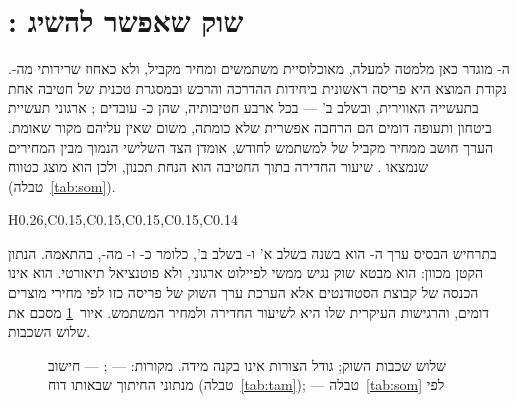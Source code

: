 \section{: שוק שאפשר להשיג}\label{sec:som}
ה- מוגדר כאן מלמטה למעלה, מאוכלוסיית משתמשים ומחיר מקביל, ולא כאחוז שרירותי מה-. נקודת המוצא היא
פריסה ראשונית ביחידות ההדרכה והרכש ובמסגרת טכנית של חטיבה אחת בתעשייה האווירית, ובשלב ב' --- בכל ארבע חטיבותיה, שהן
כ- עובדים \cite{iai2025about}; ארגוני תעשיית ביטחון ותעופה דומים הם הרחבה אפשרית שלא כומתה, משום שאין עליהם
מקור שאומת. הערך חושב ממחיר מקביל של  למשתמש לחודש, אומדן הצד השלישי הנמוך מבין המחירים שנמצאו
\cite{manualto2026pricing}. שיעור החדירה בתוך החטיבה הוא הנחת תכנון, ולכן הוא מוצג כטווח (טבלה~\ref{tab:som}).
\begin{table}[!htbp]
\centering
\caption[SOM מלמטה למעלה]{ מלמטה למעלה. נתונים:  עובדים בארבע חטיבות \cite{iai2025about}; מחיר  למשתמש לחודש \cite{manualto2026pricing}; הנחת חלוקה שווה בין חטיבות ושיעור חדירה: הנחות תכנון. ערך שנתי \mth{=} משתמשים }\label{tab:som}
\begin{pctable}{H{0.26},C{0.15},C{0.15},C{0.15},C{0.15},C{0.14}}
\end{pctable}
\end{table}
בתרחיש הבסיס ערך ה- הוא  בשנה בשלב א' ו- בשלב ב', כלומר כ- ו- מה-,
בהתאמה. הנתון הקטן מכוון: הוא מבטא שוק נגיש ממשי לפיילוט ארגוני, ולא פוטנציאל תיאורטי. הוא אינו הכנסה של קבוצת הסטודנטים אלא
הערכת ערך השוק של פריסה כזו לפי מחירי מוצרים דומים, והרגישות העיקרית שלו היא לשיעור החדירה ולמחיר המשתמש. איור~\ref{fig:somfunnel}
מסכם את שלוש השכבות.
\begin{figure}[!htbp]
\centering
{}
\caption[שלוש שכבות השוק]{שלוש שכבות השוק; גודל הצורות אינו בקנה מידה. מקורות:  --- \cite{gvr2025market};  --- חישוב מנתוני החיתוך שבאותו דוח (טבלה~\ref{tab:tam});  --- טבלה~\ref{tab:som} לפי \cite{iai2025about,manualto2026pricing}}\label{fig:somfunnel}
\end{figure}

